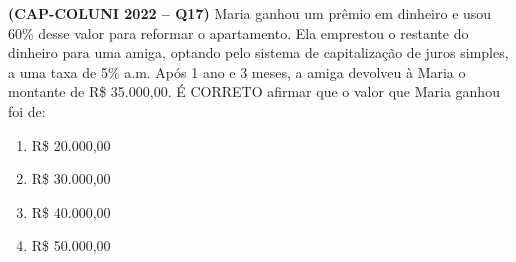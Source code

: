 \textbf{(CAP-COLUNI 2022 -- Q17)} Maria ganhou um prêmio em dinheiro e usou 60\% desse valor para reformar o apartamento. Ela emprestou o restante do dinheiro para uma amiga, optando pelo sistema de capitalização de juros simples, a uma taxa de 5\% a.m. Após 1 ano e 3 meses, a amiga devolveu à Maria o montante de R\$ 35.000,00. É CORRETO afirmar que o valor que Maria ganhou foi de:

\begin{enumerate}
	\item R\$ 20.000,00
	\item R\$ 30.000,00
	\item R\$ 40.000,00
	\item R\$ 50.000,00
\end{enumerate}

